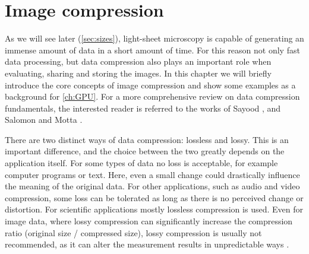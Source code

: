 


  \graphicspath{{./figures/3_processing/}}

  
  
  \chapter{Image compression}
  \label{ch:compr}
    As we will see later (\autoref{sec:sizes}), light-sheet microscopy is capable of generating an immense amount of data in a short amount of time. For this reason not only fast data processing, but data compression also plays an important role when evaluating, sharing and storing the images. In this chapter we will briefly introduce the core concepts of image compression and show some examples as a background for \autoref{ch:GPU}. For a more comprehensive review on data compression fundamentals, the interested reader is referred to the works of Sayood \cite{sayood_introduction_2012}, and Salomon and Motta \cite{salomon_handbook_2010}.
   
    There are two distinct ways of data compression: lossless and lossy. This is an important difference, and the choice between the two greatly depends on the application itself. For some types of data no loss is acceptable, for example computer programs or text. Here, even a small change could drastically influence the meaning of the original data. For other applications, such as audio and video compression, some loss can be tolerated as long as there is no perceived change or distortion. For scientific applications mostly lossless compression is used. Even for image data, where lossy compression can significantly increase the compression ratio (original size / compressed size), lossy compression is usually not recommended, as it can alter the measurement results in unpredictable ways \cite{cromey_digital_2013}.
  
